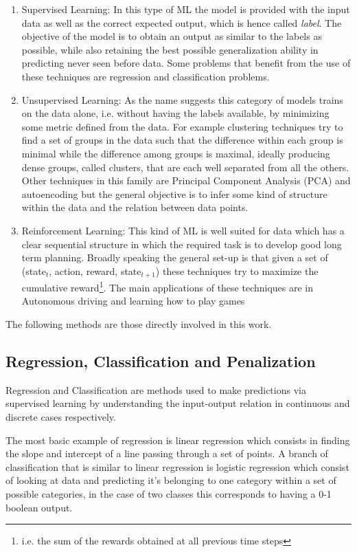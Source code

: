 \begin{enumerate}
\item Supervised Learning: In this type of ML the model is provided with the input data as well as the correct expected output, which is hence called \textit{label}. The objective of the model is to obtain an output as similar to the labels as possible, while also retaining the best possible generalization ability in predicting never seen before data. Some problems that benefit from the use of these techniques are regression and classification problems.
\item Unsupervised Learning: As the name suggests this category of models trains on the data alone, i.e. without having the labels available, by minimizing some metric defined from the data. For example clustering techniques try to find a set of groups in the data such that the difference within each group is minimal while the difference among groups is maximal, ideally producing dense groups, called clusters, that are each well separated from all the others. Other techniques in this family are Principal Component Analysis (PCA) and autoencoding but the general objective is to infer some kind of structure within the data and the relation between data points.
\item Reinforcement Learning:  This kind of ML is well suited for data which has a clear sequential structure in which the required task is to develop good long term planning. Broadly speaking the general set-up is that given a set of (state$_{t}$, action, reward, state$_{t+1}$) these techniques try to maximize the cumulative reward\footnote{i.e. the sum of the rewards obtained at all previous time steps}. The main applications of these techniques are in Autonomous driving and learning how to play games
\end{enumerate}

The following methods are those directly involved in this work.

\subsection{Regression, Classification and Penalization}
Regression and Classification are methods used to make predictions via supervised learning by understanding the input-output relation in continuous and discrete cases respectively. 

The most basic example of regression is linear regression which consists in finding the slope and intercept of a line passing through a set of points. A branch of classification that is similar to linear regression is logistic regression which consist of looking at data and predicting it's belonging to one category within a set of possible categories, in the case of two classes this corresponds to having a 0-1 boolean output.

